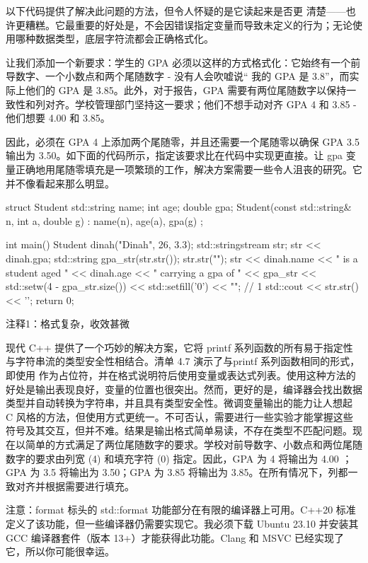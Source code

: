 以下代码提供了解决此问题的方法，但令人怀疑的是它读起来是否更 清楚——也许更糟糕。它最重要的好处是，不会因错误指定变量而导致未定义的行为；无论使用哪种数据类型，底层字符流都会正确格式化。

让我们添加一个新要求：学生的 GPA 必须以这样的方式格式化：它始终有一个前导数字、一个小数点和两个尾随数字 - 没有人会吹嘘说“ 我的 GPA 是 3.8”，而实际上他们的 GPA 是 3.85。此外，对于报告，GPA 需要有两位尾随数字以保持一致性和列对齐。学校管理部门坚持这一要求；他们不想手动对齐 GPA 4 和 3.85 - 他们想要 4.00 和 3.85。

因此，必须在 GPA 4 上添加两个尾随零，并且还需要一个尾随零以确保 GPA 3.5 输出为 3.50。如下面的代码所示，指定该要求比在代码中实现更直接。让 gpa 变量正确地用尾随零填充是一项繁琐的工作，解决方案需要一些令人沮丧的研究。它并不像看起来那么明显。


\begin{cpp}
struct Student {
  std::string name;
  int age;
  double gpa;
  Student(const std::string& n, int a, double g) : name(n), age(a), gpa(g) {}
};

int main() {
  Student dinah("Dinah", 26, 3.3);
  std::stringstream str;
  str << dinah.gpa;
  std::string gpa_str(str.str());
  str.str("");
  str << dinah.name << " is a student aged " << dinah.age << " carrying a gpa of "
      << gpa_str << std::setw(4 - gpa_str.size()) << std::setfill('0') << ""; // 1
  std::cout << str.str() << '\n';
  return 0;
}
\end{cpp}

{\footnotesize
注释1：格式复杂，收效甚微
}


现代 C++ 提供了一个巧妙的解决方案，它将 printf 系列函数的所有易于指定性与字符串流的类型安全性相结合。清单 4.7 演示了与printf 系列函数相同的形式，即使用 {} 作为占位符，并在格式说明符后使用变量或表达式列表。使用这种方法的好处是输出表现良好，变量的位置也很突出。然而，更好的是，编译器会找出数据类型并自动转换为字符串，并且具有类型安全性。微调变量输出的能力让人想起 C 风格的方法，但使用方式更统一。不可否认，需要进行一些实验才能掌握这些符号及其交互，但并不难。结果是输出格式简单易读，不存在类型不匹配问题。现在以简单的方式满足了两位尾随数字的要求。学校对前导数字、小数点和两位尾随数字的要求由列宽 (4) 和填充字符 (0) 指定。因此，GPA 为 4 将输出为 4.00 ；GPA 为 3.5 将输出为 3.50；GPA 为 3.85 将输出为 3.85。在所有情况下，列都一致对齐并根据需要进行填充。

注意：format 标头的 std::format 功能部分在有限的编译器上可用。C++20 标准定义了该功能，但一些编译器仍需要实现它。我必须下载 Ubuntu 23.10 并安装其 GCC 编译器套件（版本 13+）才能获得此功能。Clang 和 MSVC 已经实现了它，所以你可能很幸运。

